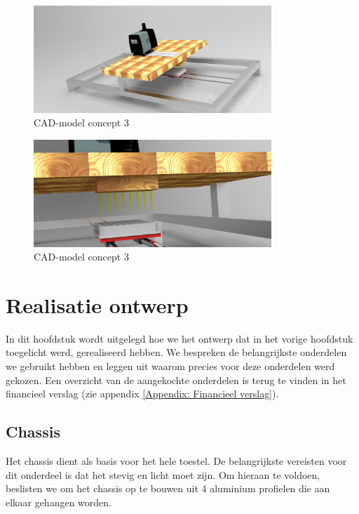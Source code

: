 \documentclass[a4paper,twoside,kulak]{kulakreport} %
\begin{document}
\begin{figure}[h]
	\centering
	\includegraphics[width=0.8\textwidth]{micdis1.jpg}
	\caption{CAD-model concept 3}
	\label{fig: CAD-model globaal}
	
\end{figure} 

\begin{figure}[h]
	\centering
	\includegraphics[width=0.8\textwidth]{micdis2.jpg}
	\caption{CAD-model concept 3}
	\label{fig: CAD-model ingezoomd}
	
\end{figure} 


\chapter{Realisatie ontwerp}

In dit hoofdstuk wordt uitgelegd hoe we het ontwerp dat in het vorige hoofdstuk toegelicht werd, gerealiseerd hebben. We bespreken de belangrijkste onderdelen we gebruikt hebben en leggen uit waarom precies voor deze onderdelen werd gekozen. Een overzicht van de aangekochte onderdelen is terug te vinden in het financieel verslag (zie appendix \ref{Appendix: Financieel verslag}).

\section{Chassis}

Het chassis dient als basis voor het hele toestel. De belangrijkste vereisten voor dit onderdeel is dat het stevig en licht moet zijn. Om hieraan te voldoen, beslisten we om het chassis op te bouwen uit 4 aluminium profielen die aan elkaar gehangen worden. 
\end{document}

